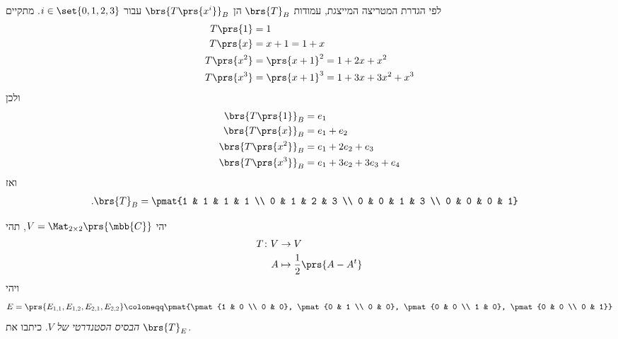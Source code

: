 \documentclass[a4paper,10pt,twoside,openany]{book}
\begin{document}
\begin{solution}
לפי הגדרת המטריצה המייצגת,
עמודות
$\brs{T}_B$
הן
$\brs{T\prs{x^i}}_B$
עבור
$i \in \set{0,1,2,3}$.
מתקיים
\begin{align*}
T\prs{1} &= 1 \\
T\prs{x} &= x+1 = 1 + x \\
T\prs{x^2} &= \prs{x+1}^2 = 1 + 2x + x^2 \\
T\prs{x^3} &= \prs{x+1}^3 = 1 + 3x + 3x^2 + x^3
\end{align*}
ולכן
\begin{align*}
\brs{T\prs{1}}_B &= e_1 \\
\brs{T\prs{x}}_B &= e_1 + e_2 \\
\brs{T\prs{x^2}}_B &= e_1 + 2 e_2 + e_3 \\
\brs{T\prs{x^3}}_B &= e_1 + 3 e_2 + 3 e_3 + e_4
\end{align*}
ואז
\begin{align*}
\text{.} \brs{T}_B &= \pmat{1 & 1 & 1 & 1 \\ 0 & 1 & 2 & 3 \\ 0 & 0 & 1 & 3 \\ 0 & 0 & 0 & 1}
\end{align*}
\end{solution}

\begin{exercisechap}
יהי
$V = \Mat_{2 \times 2}\prs{\mbb{C}}$,
תהי
\begin{align*}
T \colon V &\to V \\
A &\mapsto \frac{1}{2} \prs{A - A^t}
\end{align*}
ויהי
\[E = \prs{E_{1,1}, E_{1,2}, E_{2,1}, E_{2,2}} \coloneqq \pmat{\pmat{1 & 0 \\ 0 & 0}, \pmat{0 & 1 \\ 0 & 0}, \pmat{0 & 0 \\ 1 & 0}, \pmat{0 & 0 \\ 0 & 1}}\]
\emph{הבסיס הסטנדרטי של
$V$}.
כיתבו את
$\brs{T}_E$.
\end{exercisechap}
\end{document}
